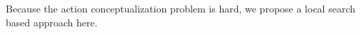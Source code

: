 Because the action conceptualization problem is hard, we propose a
local search based approach here.


